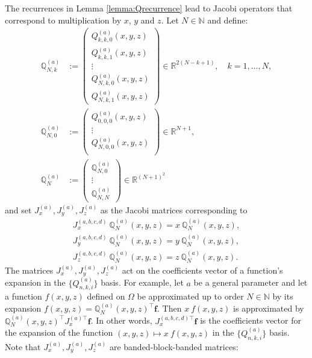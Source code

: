 \documentclass[11pt, oneside]{article}   	%
\newcommand{\R}{\mathbb{R}}
\newcommand{\N}{\mathbb{N}}
\newcommand{\scop}{Q}
\newcommand{\scopnki}{\scop_{n,k,i}}
\newcommand{\scopa}{\scop^{(a)}}
\newcommand{\scopnkia}{\scopnki^{(a)}}
\newcommand{\bigscop}{{\mathbb{Q}}}
\newcommand{\bigscopa}{\bigscop^{(a)}}
\newcommand{\bigscopNa}{\bigscopa_{N}}
\newcommand{\bigscopNka}{\bigscopa_{N,k}}
\begin{document}
The recurrences in Lemma \ref{lemma:Qrecurrence} lead to Jacobi operators that correspond to multiplication by $x$, $y$ and $z$. Let $N \in \N$ and define: 
\begin{align}
	\bigscopNka &:= 
		\begin{pmatrix}
			\scopa_{k,k,0}(x,y,z) \\
			\scopa_{k,k,1}(x,y,z) \\
			\vdots \\
			\scopa_{N,k,0}(x,y,z) \\
			\scopa_{N,k,1}(x,y,z)
		\end{pmatrix} \in \R^{2(N-k+1)},  \quad k = 1,\dots,N, \label{eqn:OPdefNka} \\ 
	\bigscopa_{N,0} &:= 
		\begin{pmatrix}
			\scopa_{0,0,0}(x,y,z) \\
			\vdots \\
			\scopa_{N,0,0}(x,y,z) \\
		\end{pmatrix} \in \R^{N+1}, \label{eqn:OPdefN0a} \\
	\bigscopNa &:= 
		\begin{pmatrix}
			\bigscopa_{N,0} \\
			\vdots \\
			\bigscopa_{N,N}
		\end{pmatrix} \in \R^{(N+1)^2} \label{eqn:OPdefNa}
\end{align}
and set $J_x^{(a)}, J_y^{(a)}, J_z^{(a)}$ as the Jacobi matrices corresponding to
\begin{align}
	J_x^{(a,b,c,d)} \: \bigscopNa(x,y,z) = x \: \bigscopNa(x,y,z), \nonumber \\
	J_y^{(a,b,c,d)} \: \bigscopNa(x,y,z) = y \: \bigscopNa(x,y,z), \label{eqn:jacobimatricesdefinition} \\
	J_z^{(a,b,c,d)} \: \bigscopNa(x,y,z) = z \: \bigscopNa(x,y,z). \nonumber
\end{align}
The matrices $J_x^{(a)}, J_y^{(a)}, J_z^{(a)}$ act on the coefficients vector of a function's expansion in the $\{\scopnkia\}$ basis. For example, let $a$ be a general parameter and let a function $f(x,y,z)$ defined on $\Omega$ be approximated up to order $N \in \N$ by its expansion $f(x,y,z) = \bigscopNa(x,y,z)^\top \mathbf{f}$. Then $x \: f(x,y,z)$ is approximated by $\bigscopNa(x,y,z)^\top {J_x^{(a)\top}} \mathbf{f}$. In other words, ${J_x^{(a,b,c,d)\top}} \mathbf{f}$ is the coefficients vector for the expansion of the function $(x,y,z) \mapsto x \: f(x,y,z)$ in the  $\{\scopnkia\}$ basis. Note that $J_x^{(a)}, J_y^{(a)}, J_z^{(a)}$ are banded-block-banded matrices:
\end{document}
